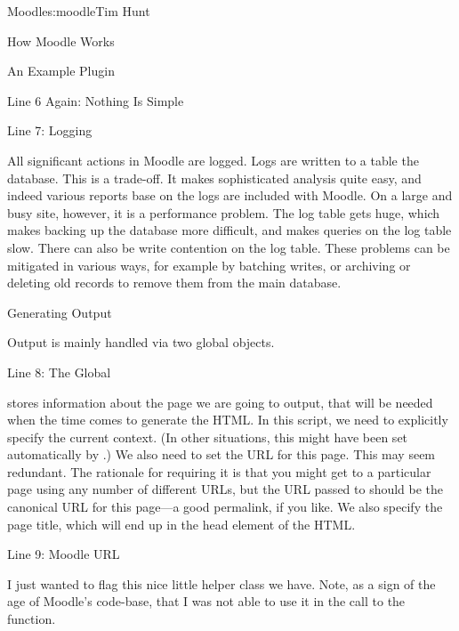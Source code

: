 \begin{aosachapter}{Moodle}{s:moodle}{Tim Hunt}
\begin{aosasect1}{How Moodle Works}
\begin{aosasect2}{An Example Plugin}
\begin{aosasect3}{Line 6 Again: Nothing Is Simple}
\end{aosasect3}

\begin{aosasect3}{Line 7: Logging}

All significant actions in Moodle are logged. Logs are written to a
table the database. This is a trade-off. It makes sophisticated
analysis quite easy, and indeed various reports base on the logs are
included with Moodle. On a large and busy site, however, it is a
performance problem. The log table gets huge, which makes backing up
the database more difficult, and makes queries on the log table
slow. There can also be write contention on the log table. These
problems can be mitigated in various ways, for example by batching
writes, or archiving or deleting old records to remove them from the
main database.

\end{aosasect3}

\end{aosasect2}

\end{aosasect1}

\begin{aosasect1}{Generating Output}

Output is mainly handled via two global objects.

\begin{aosasect2}{Line 8: The  Global}

 stores information about the page we are going to
output, that will be needed when the time comes to generate the
HTML. In this script, we need to explicitly specify the current
context. (In other situations, this might have been set automatically
by .) We also need to set the URL for this
page. This may seem redundant. The rationale for requiring it is that
you might get to a particular page using any number of different URLs,
but the URL passed to  should be the canonical URL for
this page---a good permalink, if you like. We also specify the page
title, which will end up in the head element of the HTML.

\end{aosasect2}

\begin{aosasect2}{Line 9: Moodle URL}

I just wanted to flag this nice little helper class we have. Note, as
a sign of the age of Moodle's code-base, that I was not able to use it
in the call to the  function.


\end{aosasect2}
\end{aosasect1}
\end{aosachapter}
